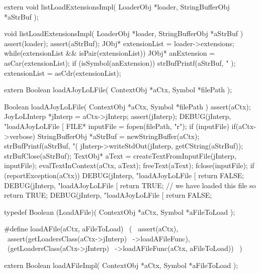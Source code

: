 \startCHeader
extern void listLoadExtensionsImpl(
  LoaderObj       *loader,
  StringBufferObj *aStrBuf
);
\stopCHeader
{}

\startCCode
void listLoadExtensionsImpl(
  LoaderObj       *loader,
  StringBufferObj *aStrBuf
) {
  assert(loader);
  assert(aStrBuf);
  JObj* extensionList = loader->extensions;
  while(extensionList && isPair(extensionList)) {
    JObj* anExtension = asCar(extensionList);
    if (isSymbol(anExtension)) {
      strBufPrintf(aStrBuf,
        "%
      );
    }
    extensionList = asCdr(extensionList);
  }
}
\stopCCode

\startCHeader
extern Boolean loadAJoyLoLFile(
  ContextObj *aCtx,
  Symbol     *filePath
);
\stopCHeader
{}

\startCCode
Boolean loadAJoyLoLFile(
  ContextObj *aCtx,
  Symbol     *filePath
) {
  assert(aCtx);
  JoyLoLInterp *jInterp = aCtx->jInterp;
  assert(jInterp);
  DEBUG(jInterp, "loadAJoyLoLFile [%
  FILE* inputFile = fopen(filePath, "r");
  if (inputFile) {
    if(aCtx->verbose) {
      StringBufferObj *aStrBuf = newStringBuffer(aCtx);      
      strBufPrintf(aStrBuf, "(%
      jInterp->writeStdOut(jInterp, getCString(aStrBuf));
      strBufClose(aStrBuf);
    }
    TextObj* aText =
      createTextFromInputFile(jInterp, inputFile);
    evalTextInContext(aCtx, aText);
    freeText(aText);
    fclose(inputFile);
    if (reportException(aCtx)) {
      DEBUG(jInterp, "loadAJoyLoLFile [%
      return FALSE;
    }
    DEBUG(jInterp, "loadAJoyLoLFile [%
    return TRUE; // we have loaded this file so return TRUE;
  }
  DEBUG(jInterp, "loadAJoyLoLFile [%
  return FALSE;
}
\stopCCode

\startCHeader
typedef Boolean (LoadAFile)(
  ContextObj *aCtx,
  Symbol     *aFileToLoad
);

#define loadAFile(aCtx, aFileToLoad)       \
  (                                        \
    assert(aCtx),                          \
    assert(getLoadersClass(aCtx->jInterp)  \
      ->loadAFileFunc),                    \
    (getLoadersClass(aCtx->jInterp)        \
      ->loadAFileFunc(aCtx, aFileToLoad))  \
  )
\stopCHeader

\setCHeaderStream{private}
\startCHeader
extern Boolean loadAFileImpl(
  ContextObj *aCtx,
  Symbol     *aFileToLoad
);
\stopCHeader
\setCHeaderStream{public}

